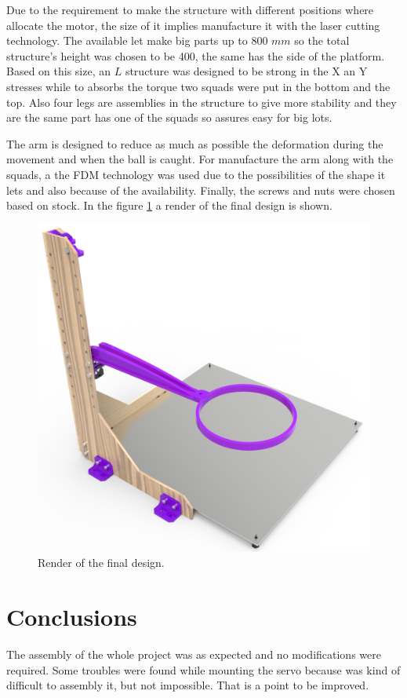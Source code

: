 		Due to the requirement to make the structure with different positions where allocate the motor, the size of it implies manufacture it with the laser cutting technology. 
		The available let make big parts up to 800 $mm$ so the total structure's height was chosen to be 400, the same has the side of the platform. 
		Based on this size, an $L$ structure was designed to be strong in the X an Y stresses while to absorbs the torque two squads were put in the bottom and the top.
		Also four legs are assemblies in the structure to give more stability and they are the same part has one of the squads so assures easy for big lots.

		The arm is designed to reduce as much as possible the deformation during the movement and when the ball is caught. For manufacture the arm along with the squads, a the FDM technology was used due to the possibilities of the shape it lets and also because of the availability. Finally, the screws and nuts were chosen based on stock. In the figure \ref{fig:render2} a render of the final design is shown.

		\begin{figure}[!hb]
			\begin{center}
				\includegraphics[width=.8\textwidth]{figures/render2}
			\end{center}
			\caption{Render of the final design.}
			\label{fig:render2}
		\end{figure}

	\section{Conclusions} %
	\label{sec:mechanics_conclusions}
		The assembly of the whole project was as expected and no modifications were required. Some troubles were found while mounting the servo because was kind of difficult to assembly it, but not impossible. That is a point to be improved.

